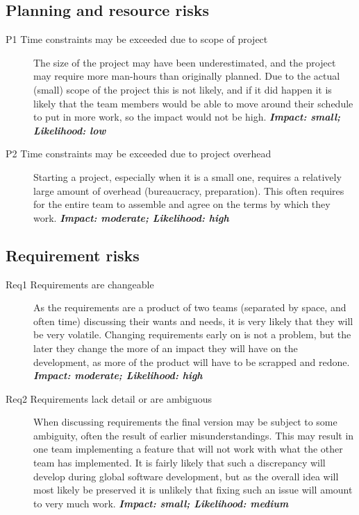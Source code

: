 \subsection{Planning and resource risks}
\begin{description}
    \item[P1 Time constraints may be exceeded due to scope of project] The size of the project may have
        been underestimated, and the project may require more man-hours than originally planned. Due to the
        actual (small) scope of the project this is not likely, and if it did happen it is likely that the
        team members would be able to move around their schedule to put in more work, so the impact would
        not be high.\newline
        \textbf{\emph{Impact: small; Likelihood: low}}
    \item[P2 Time constraints may be exceeded due to project overhead] Starting a project, especially when
        it is a small one, requires a relatively large amount of overhead (bureaucracy, preparation). This
        often requires for the entire team to assemble and agree on the terms by which they work.\newline
        \textbf{\emph{Impact: moderate; Likelihood: high}}
\end{description}

\subsection{Requirement risks}
\begin{description}
    \item[Req1 Requirements are changeable] As the requirements are a product of two teams (separated by
        space, and often time) discussing their wants and needs, it is very likely that they will be very
        volatile. Changing requirements early on is not a problem, but the later they change the more of an
        impact they will have on the development, as more of the product will have to be scrapped and redone.
        \newline
        \textbf{\emph{Impact: moderate; Likelihood: high}}
    \item[Req2 Requirements lack detail or are ambiguous] When discussing requirements the final version may
        be subject to some ambiguity, often the result of earlier misunderstandings. This may result in one
        team implementing a feature that will not work with what the other team has implemented. It is fairly
        likely that such a discrepancy will develop during global software development, but as the overall
        idea will most likely be preserved it is unlikely that fixing such an issue will amount to very much work.
        \newline
        \textbf{\emph{Impact: small; Likelihood: medium}}
\end{description}

